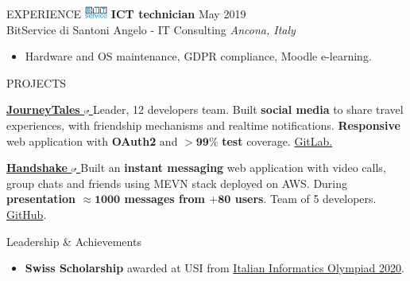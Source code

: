 \documentclass{cv} %
\def\intraexpvspace{0.15cm}
\begin{document}
\begin{minipage}[b][0.9\paperheight][t]{0.7\linewidth}
\begin{rSection}{EXPERIENCE}
    \includegraphics[width=0.75cm, trim={0cm 1.5cm 0cm 0cm}]{bitservice-icon.png}
    \textbf{ICT technician} \hfill May 2019 \\
    \hspace*{0.85cm}BitService di Santoni Angelo - IT Consulting 
    \hfill \textit{Ancona, Italy}
    \begin{itemize}
        \item Hardware and OS maintenance, GDPR compliance, Moodle e-learning.
    \end{itemize}
\end{rSection}

\begin{rSection}{PROJECTS}
    \item \textbf{\href{https://pufferfish.sa4.usi.ch/login}
        {
            JourneyTales
            \includegraphics[width=0.15cm, trim={10cm -10cm 0cm 0cm}]{ext-link-icon.png}
        }}
    {Leader, 12 developers team.
        Built \textbf{social media} to share travel experiences,
        with friendship mechanisms and realtime notifications.
        \textbf{Responsive} web application with \textbf{OAuth2} and $\boldsymbol{> 99\%}$ \textbf{test} coverage.
        \href{https://gitlab.com/usi-si-oss/teaching/projects-showcase/sa4/team-4-pufferfish}{GitLab.}
    }

    \vspace{\intraexpvspace}
    \item \textbf{\href{https://handshakeapp.ch}{
            Handshake
            \includegraphics[width=0.15cm, trim={10cm -10cm 0cm 0cm}]{ext-link-icon.png}
        }}
    {Built an \textbf{instant messaging} web application with video calls, group chats and friends
        using MEVN stack deployed on AWS.
        During \textbf{presentation $\boldsymbol{\approx1000}$ messages from $\boldsymbol{+ 80}$ users}.
        Team of 5 developers.
        \href{https://github.com/ogs-at-usi/handshake}{GitHub}.
    }
\end{rSection}
\begin{rSection}{Leadership \& Achievements}
    \vspace{0.2cm}
    \begin{itemize}[leftmargin=*]
        \itemsep 0.2em 
    \item \textbf{Swiss Scholarship} awarded at USI from 
        \href{https://www.olimpiadi-informatica.it/index.php/selezione-territoriale-20.html}{Italian Informatics Olympiad 2020}.


\end{itemize}
\end{rSection}
\end{minipage}
\end{document}
